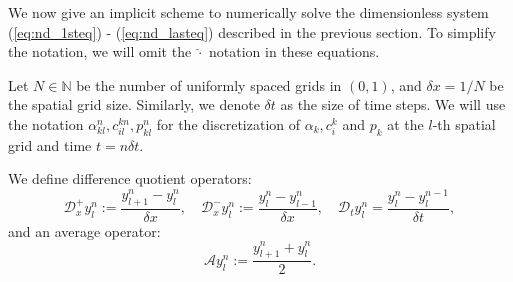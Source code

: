 \documentclass{article}
\begin{document}

We now give an implicit scheme to numerically solve the dimensionless system (\ref{eq:nd_1steq}) - (\ref{eq:nd_lasteq}) described in the previous section.
To simplify the notation, we will omit the $\hat{\cdot}$ notation in these equations.

Let $N\in \mathbb{N}$ be the number of uniformly spaced grids in $(0,1)$, and $\delta x = 1/N$ be the spatial grid size.
Similarly, we denote $\delta t$ as the size of time steps.
We will use the notation $\alpha^{n}_{kl},c_{il}^{kn}, p_{kl}^{n}$ for the discretization of $\alpha_k,c_i^k$ and $p_k$ at the $l$-th spatial grid and time $t = n\delta t$.

We define difference quotient operators:
\begin{equation}
    \mathcal{D}_x^+y^n_l:= \frac{y^n_{l+1}-y^n_{l}}{\delta x},\quad \mathcal{D}_x^- y^n_l :=\frac{y^n_l-y^n_{l-1}}{\delta x},\quad \mathcal{D}_t y^n_l = \frac{y^n_l - y^{n-1}_l}{\delta t},
\end{equation}
and an average operator:
\begin{equation}
    \mathcal{A} y_l^n := \frac{y^n_{l+1}+y^n_l}{2}.
\end{equation}
\end{document}
